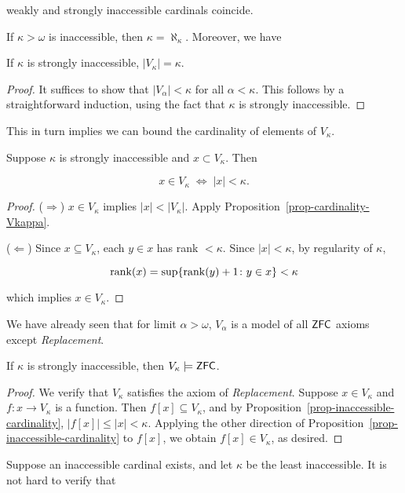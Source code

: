 weakly and strongly inaccessible cardinals coincide.

If $\kappa > \omega$ is inaccessible, then $\kappa = \aleph_\kappa$. Moreover, we have

\begin{proposition}\label{prop-cardinality-vkappa}If $\kappa$ is strongly inaccessible, $|V_\kappa| = \kappa$.

\end{proposition}\begin{proof}It suffices to show that $|V_\alpha| < \kappa$ for all $\alpha < \kappa$. This follows by a straightforward induction, using the fact that $\kappa$ is strongly inaccessible.

\end{proof}This in turn implies we can bound the cardinality of elements of $V_\kappa$.

\begin{proposition}\label{prop-inaccessible-cardinality}Suppose $\kappa$ is strongly inaccessible and $x\subset V_\kappa$. Then

\begin{equation}
x \in V_\kappa \; \Leftrightarrow \; |x| < \kappa.
\end{equation}

\end{proposition}\begin{proof}($\Rightarrow$) $x \in V_\kappa$ implies $|x| < |V_\kappa|$. Apply Proposition~\ref{prop-cardinality-Vkappa}.

($\Leftarrow$) Since $x \subseteq V_\kappa$, each $y \in x$ has rank $< \kappa$. Since $|x| < \kappa$, by regularity of $\kappa$,

\begin{equation}
\operatorname{rank}(x) = \sup\{\operatorname{rank}(y)+1 \colon y \in x\} < \kappa
\end{equation}

which implies $x \in V_\kappa$.

\end{proof}We have already seen that for limit $\alpha > \omega$, $V_\alpha$ is a model of all $\mathsf{ZFC}$ axioms except \textit{Replacement}.

\begin{theorem}\label{thm-inaccessible-zfc}If $\kappa$ is strongly inaccessible, then $V_\kappa \models \mathsf{ZFC}$.

\end{theorem}\begin{proof}We verify that $V_\kappa$ satisfies the axiom of \textit{Replacement}.
Suppose $x \in V_\kappa$ and $f:x \to V_\kappa$ is a function. Then $f[x] \subseteq V_\kappa$, and by Proposition~\ref{prop-inaccessible-cardinality}, $|f[x]| \leq |x| < \kappa$. Applying the other direction of Proposition~\ref{prop-inaccessible-cardinality} to $f[x]$, we obtain $f[x] \in V_\kappa$, as desired.

\end{proof}Suppose an inaccessible cardinal exists, and let $\kappa$ be the least inaccessible.\newline
It is not hard to verify that

